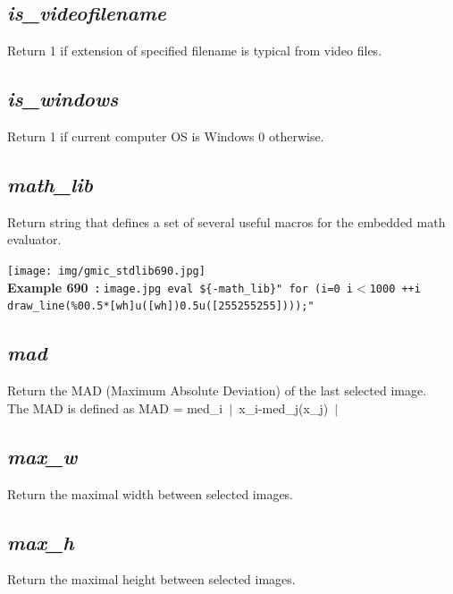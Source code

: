 \documentclass[a4paper,10.5pt,twoside]{book}
\def\comma{\discretionary{,}{}{,}}
\begin{document}
\subsection{\emph{is\_videofilename} }\vspace*{-0.7em}
Return 1 if extension of specified filename is typical from video files.


\subsection{\emph{is\_windows} }\vspace*{-0.7em}
Return 1 if current computer OS is Windows{\comma} 0 otherwise.


\subsection{\emph{math\_lib} }\vspace*{-0.7em}
Return string that defines a set of several useful macros for the embedded math evaluator.
\begin{center}\texttt{[image: img/gmic\_stdlib690.jpg]}\\
{\footnotesize \textbf{Example 690~:} \texttt{image.jpg eval \$\{-math\_lib\}" for (i=0{\comma} i$<$1000{\comma} ++i{\comma} draw\_line(\%0{\comma}0.5*[w{\comma}h]{\comma}u([w{\comma}h]){\comma}0.5{\comma}u([255{\comma}255{\comma}255])));"}}
\end{center}

\subsection{\emph{mad} }\vspace*{-0.7em}
Return the MAD (Maximum Absolute Deviation) of the last selected image.
~\\The MAD is defined as MAD = med\_i~$|$~x\_i-med\_j(x\_j)~$|$~


\subsection{\emph{max\_w} }\vspace*{-0.7em}
Return the maximal width between selected images.


\subsection{\emph{max\_h} }\vspace*{-0.7em}
Return the maximal height between selected images.
\end{document}
